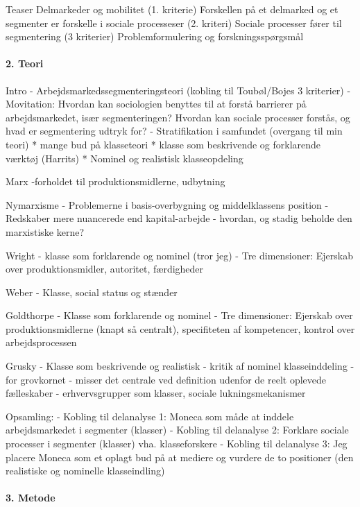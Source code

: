 	Teaser
	Delmarkeder og mobilitet (1. kriterie)
	Forskellen på et delmarked og et segmenter er forskelle i sociale processeser (2. kriteri)
	Sociale processer fører til segmentering (3 kriterier)
	Problemformulering og forskningsspørgsmål


\paragraph{2. Teori}

	Intro
		- Arbejdsmarkedssegmenteringsteori (kobling til Toubøl/Bojes 3 kriterier)
		- Movitation: Hvordan kan sociologien benyttes til at forstå barrierer på arbejdsmarkedet, især segmenteringen? Hvordan kan sociale processer forstås, og hvad er segmentering udtryk for?
		- Stratifikation i samfundet (overgang til min teori)
			* mange bud på klasseteori
			* klasse som beskrivende og forklarende værktøj (Harrits)
			* Nominel og realistisk klasseopdeling

	Marx
		-forholdet til produktionsmidlerne, udbytning

	Nymarxisme	
		- Problemerne i basis-overbygning og middelklassens position
		- Redskaber mere nuancerede end kapital-arbejde - hvordan, og stadig beholde den marxistiske kerne? 

	Wright
		- klasse som forklarende og nominel (tror jeg)
		- Tre dimensioner: Ejerskab over produktionsmidler, autoritet, færdigheder

	Weber
		- Klasse, social status og stænder

	Goldthorpe
		- Klasse som forklarende og nominel
		- Tre dimensioner: Ejerskab over produktionsmidlerne (knapt så centralt), specifiteten af kompetencer, kontrol over arbejdsprocessen 

	Grusky
		- Klasse som beskrivende og realistisk
		- kritik af nominel klasseinddeling
			- for grovkornet
			- misser det centrale ved definition udenfor de reelt oplevede fælleskaber
		- erhvervsgrupper som klasser, sociale lukningsmekanismer

	Opsamling: 
		- Kobling til delanalyse 1: Moneca som måde at inddele arbejdsmarkedet i segmenter (klasser)
		- Kobling til delanalyse 2: Forklare sociale processer i segmenter (klasser) vha. klasseforskere
		- Kobling til delanalyse 3: Jeg  placere Moneca som et oplagt bud på at mediere og vurdere de to positioner (den realistiske og nominelle klasseindling)


\paragraph{3. Metode}

